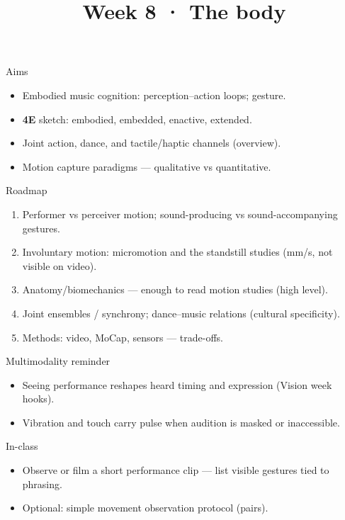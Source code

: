 \documentclass[aspectratio=169]{beamer}
\title{Week 8 · The body}
\subtitle{\coursename}
\institute{\instituteuo}
\date{}
\begin{document}
\begin{frame}
  \titlepage
\end{frame}

\begin{frame}{Aims}
  \begin{itemize}
    \item Embodied music cognition: perception--action loops; gesture.
    \item \textbf{4E} sketch: embodied, embedded, enactive, extended.
    \item Joint action, dance, and tactile/haptic channels (overview).
    \item Motion capture paradigms — qualitative vs quantitative.
  \end{itemize}
\end{frame}

\begin{frame}{Roadmap}
  \begin{enumerate}
    \item Performer vs perceiver motion; sound-producing vs sound-accompanying gestures.
    \item Involuntary motion: micromotion and the standstill studies (mm/s, not visible on video).
    \item Anatomy/biomechanics — enough to read motion studies (high level).
    \item Joint ensembles / synchrony; dance--music relations (cultural specificity).
    \item Methods: video, MoCap, sensors — trade-offs.
  \end{enumerate}
\end{frame}

\begin{frame}{Multimodality reminder}
  \begin{itemize}
    \item Seeing performance reshapes heard timing and expression (Vision week hooks).
    \item Vibration and touch carry pulse when audition is masked or inaccessible.
  \end{itemize}
\end{frame}

\begin{frame}{In-class}
  \begin{itemize}
    \item Observe or film a short performance clip — list visible gestures tied to phrasing.
    \item Optional: simple movement observation protocol (pairs).
  \end{itemize}
\end{frame}
\end{document}
